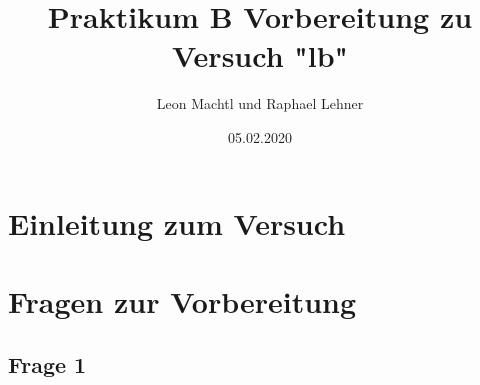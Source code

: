 \documentclass[a4paper,10pt]{scrartcl}
\title{Praktikum B Vorbereitung zu Versuch "lb"}
\author{Leon Machtl und Raphael Lehner}
\date{05.02.2020}
\begin{document}
	\maketitle
	\tableofcontents
	\newpage
	
	\section{Einleitung zum Versuch}
		
	\section{Fragen zur Vorbereitung}
		\subsection{Frage 1}
			
		
	
\end{document}
